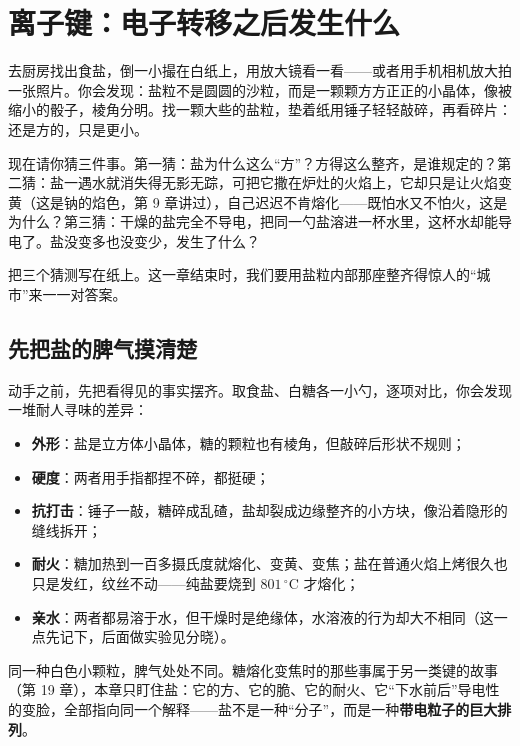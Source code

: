 \chapter{离子键：电子转移之后发生什么}

\begin{kaichang}
去厨房找出食盐，倒一小撮在白纸上，用放大镜看一看——或者用手机相机放大拍一张照片。你会发现：盐粒不是圆圆的沙粒，而是一颗颗方方正正的小晶体，像被缩小的骰子，棱角分明。找一颗大些的盐粒，垫着纸用锤子轻轻敲碎，再看碎片：还是方的，只是更小。

现在请你猜三件事。第一猜：盐为什么这么“方”？方得这么整齐，是谁规定的？第二猜：盐一遇水就消失得无影无踪，可把它撒在炉灶的火焰上，它却只是让火焰变黄（这是钠的焰色，第 9 章讲过），自己迟迟不肯熔化——既怕水又不怕火，这是为什么？第三猜：干燥的盐完全不导电，把同一勺盐溶进一杯水里，这杯水却能导电了。盐没变多也没变少，发生了什么？

把三个猜测写在纸上。这一章结束时，我们要用盐粒内部那座整齐得惊人的“城市”来一一对答案。
\end{kaichang}

\section{先把盐的脾气摸清楚}

动手之前，先把看得见的事实摆齐。取食盐、白糖各一小勺，逐项对比，你会发现一堆耐人寻味的差异：

\begin{itemize}[itemsep=2pt]
\item \textbf{外形}：盐是立方体小晶体，糖的颗粒也有棱角，但敲碎后形状不规则；
\item \textbf{硬度}：两者用手指都捏不碎，都挺硬；
\item \textbf{抗打击}：锤子一敲，糖碎成乱碴，盐却裂成边缘整齐的小方块，像沿着隐形的缝线拆开；
\item \textbf{耐火}：糖加热到一百多摄氏度就熔化、变黄、变焦；盐在普通火焰上烤很久也只是发红，纹丝不动——纯盐要烧到 $801\,^{\circ}\mathrm{C}$ 才熔化；
\item \textbf{亲水}：两者都易溶于水，但干燥时是绝缘体，水溶液的行为却大不相同（这一点先记下，后面做实验见分晓）。
\end{itemize}

同一种白色小颗粒，脾气处处不同。糖熔化变焦时的那些事属于另一类键的故事（第 19 章），本章只盯住盐：它的方、它的脆、它的耐火、它“下水前后”导电性的变脸，全部指向同一个解释——盐不是一种“分子”，而是一种\textbf{带电粒子的巨大排列}。

